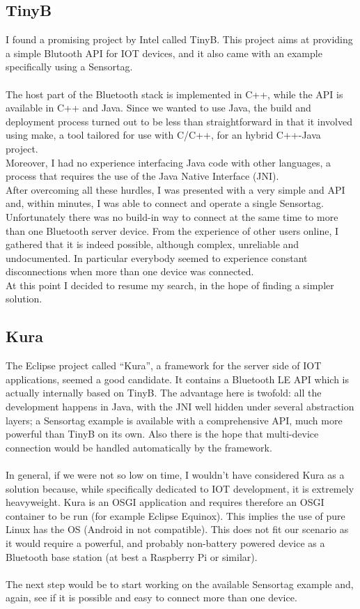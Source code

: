 \documentclass[12pt]{article}
\begin{document}
\subsection{TinyB}
I found a promising project by Intel called TinyB. This project aims at providing a simple Blutooth API for IOT devices, and it also came with an example specifically using a Sensortag.\\\\
The host part of the Bluetooth stack is implemented in C++, while the API is available in C++ and Java. Since we wanted to use Java, the build and deployment process turned out to be less than straightforward in that it involved using make, a tool tailored for use with C/C++, for an hybrid C++-Java project.\\
Moreover, I had no experience interfacing Java code with other languages, a process that requires the use of the Java Native Interface (JNI).\\
After overcoming all these hurdles, I was presented with a very simple and API and, within minutes, I was able to connect and operate a single Sensortag. Unfortunately there was no build-in way to connect at the same time to more than one Bluetooth server device. From the experience of other users online, I gathered that it is indeed possible, although complex, unreliable and undocumented. In particular everybody seemed to experience constant disconnections when more than one device was connected.\\
At this point I decided to resume my search, in the hope of finding a simpler solution.


\subsection{Kura}
The Eclipse project called “Kura”, a framework for the server side of IOT applications, seemed a good candidate. It contains a Bluetooth LE API which is actually internally based on TinyB. The advantage here is twofold: all the development happens in Java, with the JNI well hidden under several abstraction layers; a Sensortag example is available with a comprehensive API, much more powerful than TinyB on its own. Also there is the hope that multi-device connection would be handled automatically by the framework.\\\\
In general, if we were not so low on time, I wouldn’t have considered Kura as a solution because, while specifically dedicated to IOT development, it is extremely heavyweight. Kura is an OSGI application and requires therefore an OSGI container to be run (for example Eclipse Equinox). This implies the use of pure Linux has the OS (Android in not compatible). This does not fit our scenario as it would require a powerful, and probably non-battery powered device as a Bluetooth base station (at best a Raspberry Pi or similar).\\\\
The next step would be to start working on the available Sensortag example and, again, see if it is possible and easy to connect more than one device.\\
\end{document}
